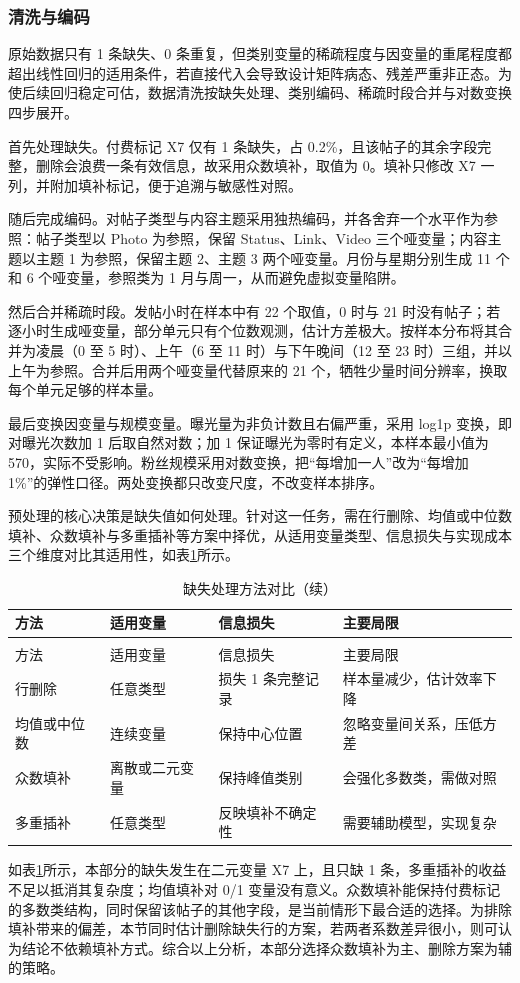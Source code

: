 \subsubsection{清洗与编码}

原始数据只有 1 条缺失、0 条重复，但类别变量的稀疏程度与因变量的重尾程度都超出线性回归的适用条件，若直接代入会导致设计矩阵病态、残差严重非正态。为使后续回归稳定可估，数据清洗按缺失处理、类别编码、稀疏时段合并与对数变换四步展开。

首先处理缺失。付费标记 X7 仅有 1 条缺失，占 0.2\%，且该帖子的其余字段完整，删除会浪费一条有效信息，故采用众数填补，取值为 0。填补只修改 X7 一列，并附加填补标记，便于追溯与敏感性对照。

随后完成编码。对帖子类型与内容主题采用独热编码，并各舍弃一个水平作为参照：帖子类型以 Photo 为参照，保留 Status、Link、Video 三个哑变量；内容主题以主题 1 为参照，保留主题 2、主题 3 两个哑变量。月份与星期分别生成 11 个和 6 个哑变量，参照类为 1 月与周一，从而避免虚拟变量陷阱。

然后合并稀疏时段。发帖小时在样本中有 22 个取值，0 时与 21 时没有帖子；若逐小时生成哑变量，部分单元只有个位数观测，估计方差极大。按样本分布将其合并为凌晨（0 至 5 时）、上午（6 至 11 时）与下午晚间（12 至 23 时）三组，并以上午为参照。合并后用两个哑变量代替原来的 21 个，牺牲少量时间分辨率，换取每个单元足够的样本量。

最后变换因变量与规模变量。曝光量为非负计数且右偏严重，采用 log1p 变换，即对曝光次数加 1 后取自然对数；加 1 保证曝光为零时有定义，本样本最小值为 570，实际不受影响。粉丝规模采用对数变换，把“每增加一人”改为“每增加 1\%”的弹性口径。两处变换都只改变尺度，不改变样本排序。

预处理的核心决策是缺失值如何处理。针对这一任务，需在行删除、均值或中位数填补、众数填补与多重插补等方案中择优，从适用变量类型、信息损失与实现成本三个维度对比其适用性，如表\ref{tab:algo2}所示。

\begin{longtable}{>{\centering\arraybackslash}p{}>{\centering\arraybackslash}p{}>{\centering\arraybackslash}p{}>{\centering\arraybackslash}p{}}
  \caption{缺失处理方法对比}
  \label{tab:algo2} \\
  \toprule
  方法 & 适用变量 & 信息损失 & 主要局限 \\
  \midrule
  \endfirsthead
  \caption{缺失处理方法对比（续）} \\
  \toprule
  方法 & 适用变量 & 信息损失 & 主要局限 \\
  \midrule
  \endhead
  \bottomrule
  \endfoot
  行删除 & 任意类型 & 损失 1 条完整记录 & 样本量减少，估计效率下降 \\
  均值或中位数 & 连续变量 & 保持中心位置 & 忽略变量间关系，压低方差 \\
  众数填补 & 离散或二元变量 & 保持峰值类别 & 会强化多数类，需做对照 \\
  多重插补 & 任意类型 & 反映填补不确定性 & 需要辅助模型，实现复杂 \\
\end{longtable}

如表\ref{tab:algo2}所示，本部分的缺失发生在二元变量 X7 上，且只缺 1 条，多重插补的收益不足以抵消其复杂度；均值填补对 0/1 变量没有意义。众数填补能保持付费标记的多数类结构，同时保留该帖子的其他字段，是当前情形下最合适的选择。为排除填补带来的偏差，本节同时估计删除缺失行的方案，若两者系数差异很小，则可认为结论不依赖填补方式。综合以上分析，本部分选择众数填补为主、删除方案为辅的策略。
